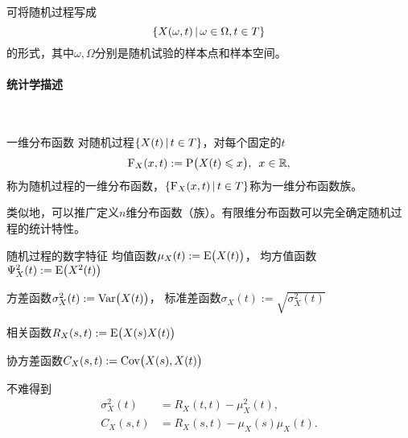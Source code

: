 可将随机过程写成
\[
	\left\{X(\omega,t)\,\middle\vert\,\omega\in\Omega,t\in T\right\}
\]
的形式，其中$\omega,\Omega$分别是随机试验的样本点和样本空间。
\paragraph{统计学描述}~
\begin{definition}{一维分布函数}{}
	对随机过程$\left\{X(t)\,\middle\vert\,t\in T\right\}$，对每个固定的$t$
	\begin{align}
		\operatorname{F}_X(x,t):=\operatorname{P}\bigl(X(t)\leqslant x\bigr),\enspace x\in\mathbb R,
	\end{align}
	称为随机过程的一维分布函数，$\left\{\operatorname{F}_X(x,t)\,\middle\vert\,t\in T\right\}$称为一维分布函数族。
\end{definition}
类似地，可以推广定义$n$维分布函数（族）。有限维分布函数可以完全确定随机过程的统计特性。
\begin{definition}{随机过程的数字特征}{}
	均值函数$\mu_X(t):=\operatorname{E}\bigl(X(t)\bigr)$，
	均方值函数$\Psi^2_X(t):=\operatorname{E}\bigl(X^2(t)\bigr)$

	方差函数$\sigma_X^2(t):=\operatorname{Var}\bigl(X(t)\bigr)$，
	标准差函数$\sigma_X(t):=\sqrt{\sigma^2_X(t)}$

	相关函数$R_X(s,t):=\operatorname{E}\bigl(X(s)X(t)\bigr)$

	协方差函数$C_X(s,t):=\operatorname{Cov}\bigl(X(s),X(t)\bigr)$
\end{definition}
不难得到
\begin{align*}
	\sigma_X^2(t)&=R_X(t,t)-\mu_X^2(t),\\
	C_X(s,t)&=R_X(s,t)-\mu_X(s)\mu_X(t).
\end{align*}
